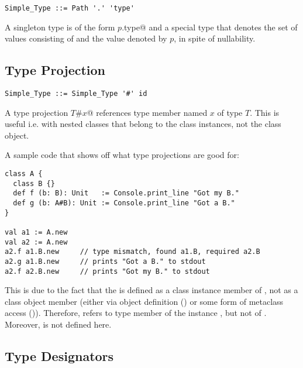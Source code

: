 \syntax\begin{lstlisting}
Simple_Type ::= Path '.' 'type'
\end{lstlisting}

A singleton type is of the form \lstinline@$p$.type@ and a special type that denotes the set of values consisting of  and the value denoted by $p$, in spite of nullability.





\subsection{Type Projection}
\label{sec:type-projection}

\syntax\begin{lstlisting}
Simple_Type ::= Simple_Type '#' id
\end{lstlisting}

A type projection \lstinline@$T$#$x$@ references type member named $x$ of type $T$. This is useful i.e. with nested classes that belong to the class instances, not the class object. 

\example A sample code that shows off what type projections are good for:
\begin{lstlisting}
class A {
  class B {}
  def f (b: B): Unit   := Console.print_line "Got my B."
  def g (b: A#B): Unit := Console.print_line "Got a B."
}

val a1 := A.new
val a2 := A.new
a2.f a1.B.new     // type mismatch, found a1.B, required a2.B
a2.g a1.B.new     // prints "Got a B." to stdout
a2.f a2.B.new     // prints "Got my B." to stdout
\end{lstlisting}
This is due to the fact that the  is defined as a class instance member of , not as a class object member (either via object definition () or some form of metaclass access ()). Therefore,  refers to type member  of the instance , but not of . Moreover,  is not defined here. 







\subsection{Type Designators}
\label{sec:type-designators}

